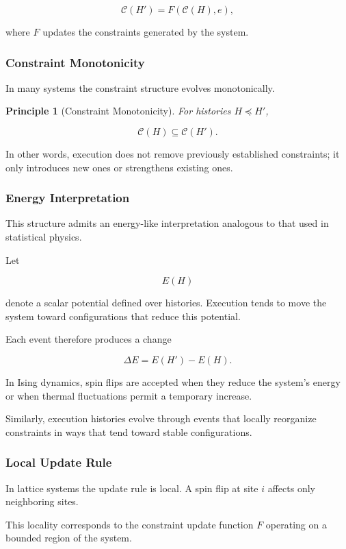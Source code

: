 \documentclass[12pt]{article}
\newtheorem{principle}{Principle}
\begin{document}
\[
\mathcal{C}(H') = F(\mathcal{C}(H), e),
\]

where $F$ updates the constraints generated by the system.

\subsubsection{Constraint Monotonicity}

In many systems the constraint structure evolves monotonically.

\begin{principle}[Constraint Monotonicity]
For histories $H \preceq H'$,

\[
\mathcal{C}(H) \subseteq \mathcal{C}(H').
\]
\end{principle}

In other words, execution does not remove previously
established constraints; it only introduces new ones
or strengthens existing ones.

\subsubsection{Energy Interpretation}

This structure admits an energy-like interpretation
analogous to that used in statistical physics.

Let

\[
E(H)
\]

denote a scalar potential defined over histories.
Execution tends to move the system toward configurations
that reduce this potential.

Each event therefore produces a change

\[
\Delta E = E(H') - E(H).
\]

In Ising dynamics, spin flips are accepted when they
reduce the system's energy or when thermal fluctuations
permit a temporary increase.

Similarly, execution histories evolve through events
that locally reorganize constraints in ways that tend
toward stable configurations.

\subsubsection{Local Update Rule}

In lattice systems the update rule is local.
A spin flip at site $i$ affects only neighboring
sites.

This locality corresponds to the constraint update
function $F$ operating on a bounded region of the
system.
\end{document}
